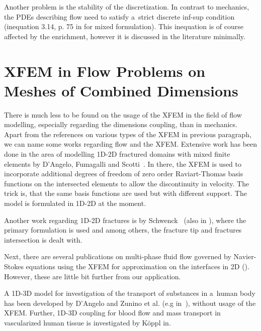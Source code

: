 Another problem is the stability of the discretization. In contrast to mechanics, the PDEs describing flow
need to satisfy a~strict discrete inf-sup condition (inequation 3.14, p. 75 in \cite{brezzi_mixed_1991} for mixed formulation).
This inequation is of course affected by the enrichment, however it is discussed in the literature minimally.


\section{XFEM in Flow Problems on Meshes of Combined Dimensions} \label{sec:soa_xfem_combined}


There is much less to be found on the usage of the XFEM in the field of flow modelling, especially regarding the dimensions coupling,
than in mechanics.
Apart from the references on various types of the XFEM in previous paragraph, we can name some works regarding flow and the XFEM.
Extensive work has been done in the area of modelling 1D-2D fractured domains with mixed finite 
elements by D'Angelo, Fumagalli and Scotti~\cite{fumagalli_numerical_2012, dangelo_mixed_2012, fumagalli_efficient_2014}. 
In there, the XFEM is used to incorporate additional degrees of freedom of zero order Raviart-Thomas basis 
functions on the intersected elements to allow the discontinuity in velocity. The trick is, that the same
basis functions are used but with different support. The model is formulated in 1D-2D at the moment.

Another work regarding 1D-2D fractures is by Schwenck~\cite{schwenck_xfem-based_2015} (also in \cite{schwenck_2015}), 
where the primary formulation is used and among others, the fracture tip and fractures intersection is dealt with.

Next, there are several publications on multi-phase fluid flow governed by Navier-Stokes equations using the XFEM for
approximation on the interfaces in 2D (\cite{diez_stable_2013,sauerland_stable_2013}). However, these are
little bit further from our application.

A 1D-3D model for investigation of the transport of substances in a~human body has been developed by D'Angelo 
and Zunino et al. (e.g in~\cite{dangelo_coupling_2008,cattaneo_numerical_2015}), without usage of the XFEM.
Further, 1D-3D coupling for blood flow and mass transport in vascularized human tissue is
investigated by K{\" o}ppl in\cite{koppl_tum_2015}.
